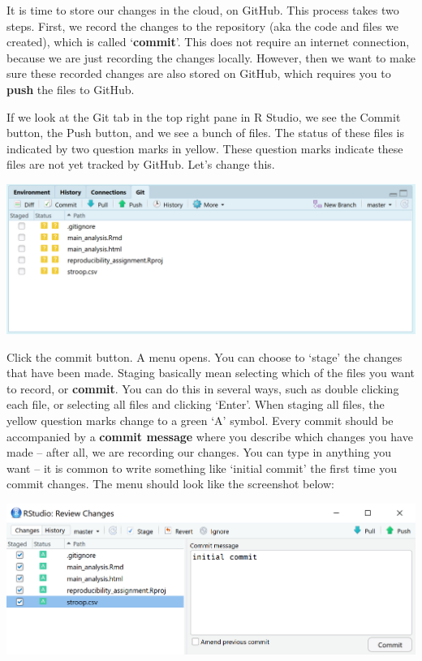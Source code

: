 \documentclass[
  oneside]{krantz}
\begin{document}
It is time to store our changes in the cloud, on GitHub. This process takes two
steps. First, we record the changes to the repository (aka the code and files we
created), which is called `\textbf{commit}'. This does not require an internet
connection, because we are just recording the changes locally. However, then we
want to make sure these recorded changes are also stored on GitHub, which
requires you to \textbf{push} the files to GitHub.

If we look at the Git tab in the top right pane in R Studio, we see the Commit
button, the Push button, and we see a bunch of files. The status of these files
is indicated by two question marks in yellow. These question marks indicate
these files are not yet tracked by GitHub. Let's change this.

\begin{center}\includegraphics[width=1\linewidth]{images/ca36fd42cb6d9189534590e5cfcb9411} \end{center}

Click the commit button. A menu opens. You can choose to `stage' the changes
that have been made. Staging basically mean selecting which of the files you
want to record, or \textbf{commit}. You can do this in several ways, such as double
clicking each file, or selecting all files and clicking `Enter'. When staging
all files, the yellow question marks change to a green `A' symbol. Every commit
should be accompanied by a \textbf{commit message} where you describe which changes
you have made -- after all, we are recording our changes. You can type in
anything you want -- it is common to write something like `initial commit' the
first time you commit changes. The menu should look like the screenshot below:

\begin{center}\includegraphics[width=1\linewidth]{images/df26ee077662dda7148be10da4c410e8} \end{center}
\end{document}
